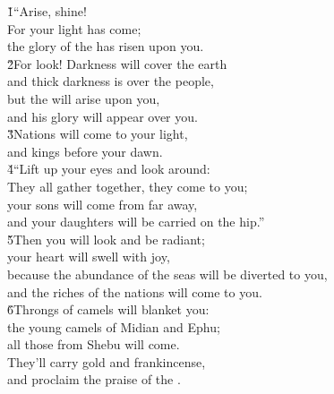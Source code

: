\begin{poetry}
\poeml {}
\v{1}``Arise, shine! \\
\poemll    For your light has come; \\
\poemlll       the glory of the  has risen upon you. \\
\poeml \v{2}For look! Darkness will cover the earth \\
\poemll    and thick darkness is over the people, \\
\poeml but the  will arise upon you, \\
\poemll    and his glory will appear over you. \\
\poeml \v{3}Nations will come to your light, \\
\poemll    and kings before your dawn. \\
\poeml \v{4}``Lift up your eyes and look around: \\
\poemll    They all gather together, they come to you; \\
\poeml your sons will come from far away, \\
\poemll    and your daughters will be carried on the hip.'' \\
\poeml \v{5}Then you will look and be radiant; \\
\poemll    your heart will swell with joy, \\
\poeml because the abundance of the seas will be diverted to you, \\
\poemll    and the riches of the nations will come to you. \\
\poeml \v{6}Throngs of camels will blanket you: \\
\poemll    the young camels of Midian and Ephu; \\
\poemlll       all those from Shebu will come. \\
\poeml They'll carry gold and frankincense, \\
\poemll    and proclaim the praise of the . \\

\end{poetry}

